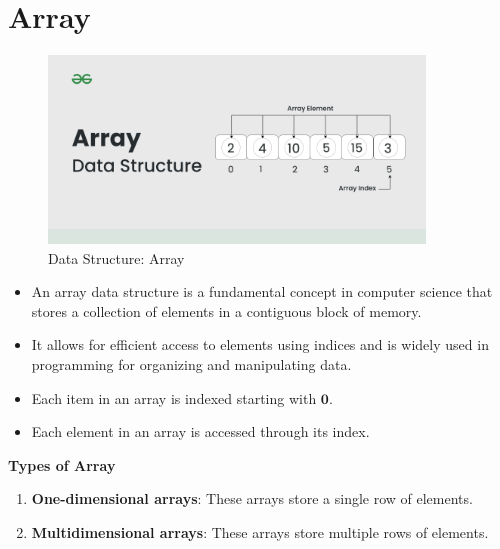 \section{Array \cite{gfg-array-data-structure-guide}}\label{array}

\begin{table}[h]
    \begin{minipage}{0.35\linewidth}
        \begin{figure}[H]
            \centering
            \includegraphics[width=\linewidth,height=5cm,keepaspectratio]{Pictures/ds-algo/Array-data-structure.png}
            \caption{Data Structure: Array}
        \end{figure}
    \end{minipage}
    \hfill
    \begin{minipage}{0.65\linewidth}
        \begin{itemize}
            \item An array data structure is a fundamental concept in computer science that stores a collection of elements in a contiguous block of memory.

            \item It allows for efficient access to elements using indices and is widely used in programming for organizing and manipulating data.

            \item Each item in an array is indexed starting with $\mathbf{0}$. 
            
            \item Each element in an array is accessed through its index.
        \end{itemize}
    \end{minipage}
\end{table}

\textbf{Types of Array}
\begin{enumerate}
    \item \textbf{One-dimensional arrays}: These arrays store a single row of elements.
    \item \textbf{Multidimensional arrays}: These arrays store multiple rows of elements.
\end{enumerate}


